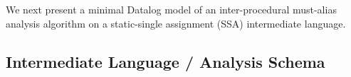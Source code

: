 


We next present a minimal Datalog model of an inter-procedural must-alias analysis
algorithm on a static-single assignment (SSA) intermediate language.

\subsection{Intermediate Language / Analysis Schema}


